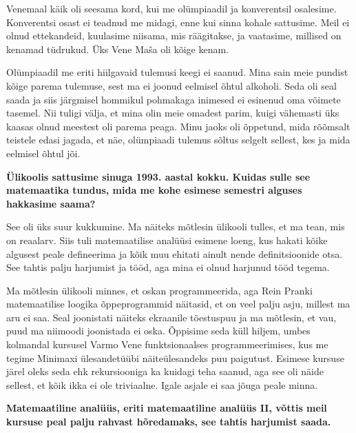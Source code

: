 Venemaal käik oli seesama
kord, kui me olümpiaadil ja konverentsil osalesime. Konverentsi osast ei teadnud
me midagi, enne kui sinna kohale sattusime. Meil ei olnud 
ettekandeid, kuulasime niisama, mis räägitakse, ja vaatasime, millised on
kenamad tüdrukud. Üks Vene Maša oli kõige kenam.

Olümpiaadil me eriti hiilgavaid tulemusi keegi ei saanud. Mina sain meie
pundist kõige parema tulemuse, sest ma ei joonud eelmisel õhtul alkoholi. Seda
oli seal saada ja siis järgmisel hommikul pohmakaga inimesed ei esinenud oma
võimete tasemel. Nii tuligi välja, et mina olin meie omadest parim, kuigi
vähemasti üks kaasas olnud meestest oli parema peaga. Minu jaoks oli õppetund,
mida rõõmsalt teistele edasi jagada, et näe, olümpiaadi tulemus sõltus selgelt
sellest, kes ja mida eelmisel õhtul jõi.

\textbf{Ülikoolis sattusime sinuga 1993. aastal kokku.
Kuidas sulle see matemaatika tundus, mida me kohe esimese semestri alguses
hakkasime saama?}

See oli üks suur kukkumine. Ma näiteks mõtlesin ülikooli tulles, et ma tean,
mis on reaalarv. Siis tuli matemaatilise analüüsi esimene loeng, kus hakati
kõike algusest peale defineerima ja kõik muu ehitati
ainult nende definitsioonide otsa. See tahtis palju harjumist ja 
tööd, aga mina ei olnud harjunud tööd tegema.

Ma mõtlesin ülikooli minnes, et oskan programmeerida, aga Rein
Pranki matemaatilise loogika õppeprogrammid näitasid,
et on veel palju asju, millest ma aru ei saa. Seal joonistati näiteks ekraanile
tõestuspuu ja ma mõtlesin, et vau, puud ma niimoodi joonistada ei
oska. Õppisime seda küll hiljem, umbes kolmandal kursusel Varmo
Vene funktsionaalses programmeerimises, kus me tegime
Minimaxi ülesandetüübi näiteülesandeks puu paigutust. Esimese
kursuse järel oleks seda ehk rekursiooniga ka kuidagi teha saanud, aga see oli
näide sellest, et kõik ikka ei ole triviaalne. Igale asjale ei saa jõuga
peale minna.

\textbf{Matemaatiline analüüs, eriti matemaatiline analüüs II, võttis
meil kursuse peal palju rahvast hõredamaks, see tahtis harjumist saada.}

